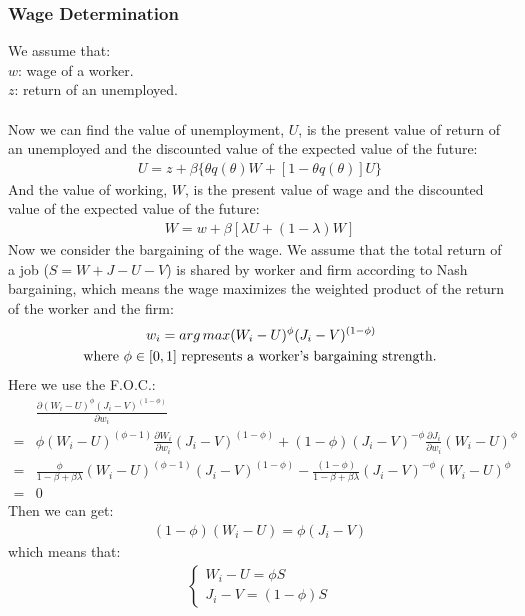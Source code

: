 \documentclass{article}
\begin{document}
\subsubsection{Wage Determination}
We assume that:\\
\indent $w$: wage of a worker.\\
\indent $z$: return of an unemployed.\\\\
Now we can find the value of unemployment, $U$, is the present value of return of an unemployed and the discounted value of the expected value of the future:
\begin{align}
	U = z + \beta \{\theta q(\theta) W + [1 - \theta q(\theta)]U\} \label{eq: Wage determination unemployment}
\end{align}
And the value of working, $W$, is the present value of wage and the discounted value of the expected value of the future:
\begin{align}
	W = w + \beta [\lambda U + (1 - \lambda)W] \label{eq: Wage determination employment}
\end{align}
Now we consider the bargaining of the wage. We assume that the total return of a job ($S = W + J - U - V$) is shared by worker and firm according to Nash bargaining, which means the wage maximizes the weighted product of the return of the worker and the firm:
\begin{align*}
	&\indent\indent\indent w_i = arg\, max (W_i - U)^\phi (J_i - V)^{(1 - \phi)}\\
	&\text{where $\phi \in [0, 1]$ represents a worker's bargaining strength.}
\end{align*}
Here we use the F.O.C.:
\begin{align*}
	&\frac{\partial (W_i - U)^\phi (J_i - V)^{(1 - \phi)}}{\partial w_i}\\ 
	=& \phi (W_i - U)^{(\phi - 1)} \frac{\partial W_i}{\partial w_i} (J_i - V)^{(1 - \phi)} + (1 - \phi) (J_i - V)^{-\phi} \frac{\partial J_i}{\partial w_i} (W_i - U)^\phi\\
	=& \frac{\phi}{1 - \beta + \beta \lambda} (W_i - U)^{(\phi - 1)} (J_i - V)^{(1 - \phi)} - \frac{(1 - \phi)}{1 - \beta + \beta \lambda} (J_i - V)^{-\phi} (W_i - U)^\phi\\
	=& 0 
\end{align*}
Then we can get:
\begin{align*}
	(1 - \phi)(W_i - U) = \phi (J_i - V)
\end{align*}
which means that:
\begin{align}
	\left\{
			\begin{array}{lr}
				W_i - U = \phi S\\
				J_i - V = (1 - \phi) S
 			\end{array}
 	\right. \label{eq: Wage determination: FOC}
\end{align}
\end{document}
